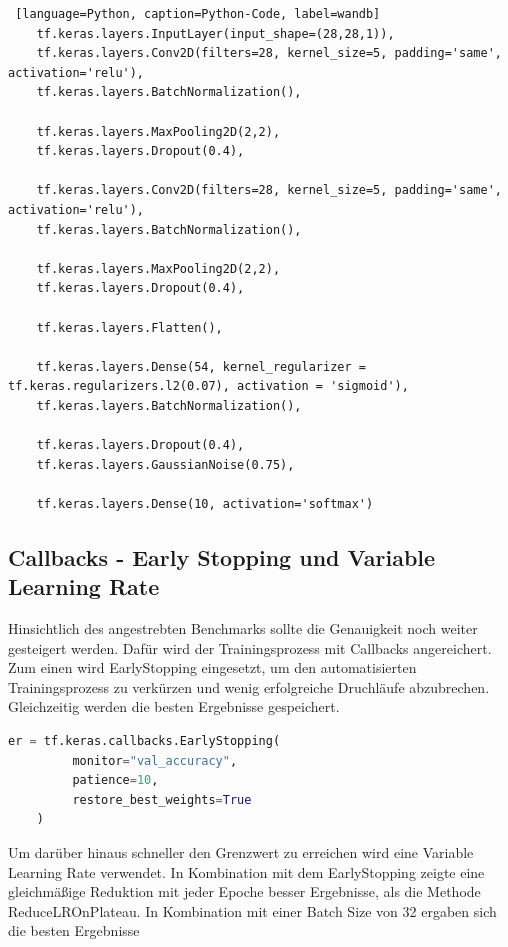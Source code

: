 \documentclass[
fontsize=12pt,					%
paper=a4,						%
twoside=true, 					%
listof=totoc, 					%
bibliography=totoc,				%
titlepage, 						%
headsepline, 					%
DIV=12,							%
BCOR=6mm,						%
cleardoublepage=empty,			%
parskip,							%
ngerman
]{scrartcl}
\begin{document}
\begin{lstlisting} [language=Python, caption=Python-Code, label=wandb]
	tf.keras.layers.InputLayer(input_shape=(28,28,1)),
	tf.keras.layers.Conv2D(filters=28, kernel_size=5, padding='same', activation='relu'),
	tf.keras.layers.BatchNormalization(),
	
	tf.keras.layers.MaxPooling2D(2,2),
	tf.keras.layers.Dropout(0.4),
	
	tf.keras.layers.Conv2D(filters=28, kernel_size=5, padding='same', activation='relu'),
	tf.keras.layers.BatchNormalization(),
	
	tf.keras.layers.MaxPooling2D(2,2),
	tf.keras.layers.Dropout(0.4),
	
	tf.keras.layers.Flatten(),
	
	tf.keras.layers.Dense(54, kernel_regularizer = tf.keras.regularizers.l2(0.07), activation = 'sigmoid'),
	tf.keras.layers.BatchNormalization(),
	
	tf.keras.layers.Dropout(0.4),
	tf.keras.layers.GaussianNoise(0.75),
	
	tf.keras.layers.Dense(10, activation='softmax')
\end{lstlisting}

\subsection{Callbacks - Early Stopping und Variable Learning Rate}

Hinsichtlich des angestrebten Benchmarks sollte die Genauigkeit noch weiter gesteigert werden. Dafür wird der Trainingsprozess mit Callbacks angereichert.\\
Zum einen wird EarlyStopping eingesetzt, um den automatisierten Trainingsprozess zu verkürzen und wenig erfolgreiche Druchläufe abzubrechen. Gleichzeitig werden die besten Ergebnisse gespeichert. 

\begin{lstlisting}[language=Python, caption=Early Stopping, label=er]
	er = tf.keras.callbacks.EarlyStopping(
		 monitor="val_accuracy",
		 patience=10,
	     restore_best_weights=True
	)
\end{lstlisting}

Um darüber hinaus schneller den Grenzwert zu erreichen wird eine Variable Learning Rate verwendet. In Kombination mit dem EarlyStopping zeigte eine gleichmäßige Reduktion mit jeder Epoche besser Ergebnisse, als die Methode ReduceLROnPlateau. In Kombination mit einer Batch Size von 32 ergaben sich die besten Ergebnisse
\end{document}
